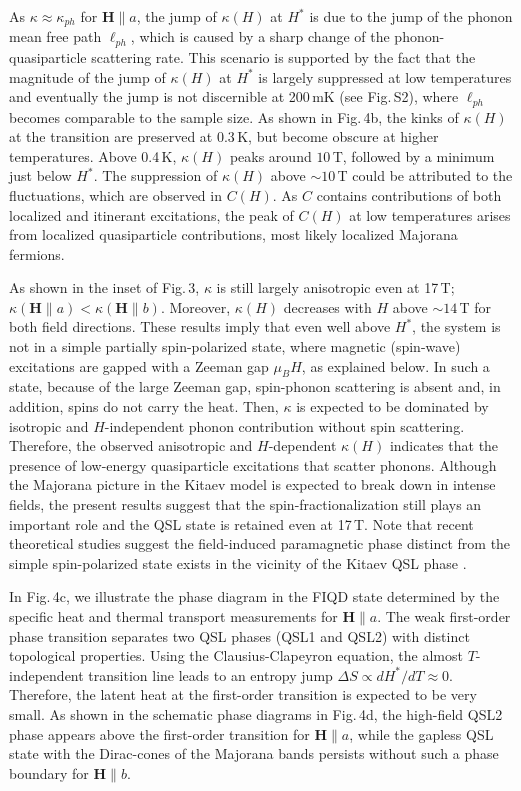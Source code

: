 \documentclass[twocolumn,preprintnumbers,prl,superscriptaddress,amsmath,amssymb,amsfonts]{revtex4}
\begin{document}
As $\kappa\approx\kappa_{ph}$ for ${\bm H}\parallel a$, the jump of $\kappa(H)$ at $H^*$ is due to the jump of the phonon mean free path $\ell_{ph}$, which is caused by a sharp change of the phonon-quasiparticle scattering rate. This scenario is supported by the fact that the magnitude of the jump of $\kappa(H)$ at $H^*$ is largely suppressed at low temperatures and eventually the jump is not discernible at 200\,mK (see Fig.\,S2), where $\ell_{ph}$ becomes comparable to the sample size. As shown in Fig.\,4b, the kinks of $\kappa(H)$ at the transition are preserved at 0.3\,K, but become obscure at higher temperatures. 
Above 0.4\,K, $\kappa(H)$ peaks around $10$\,T, followed by a minimum just below $H^*$. The suppression of $\kappa(H)$ above $\sim10$\,T could be attributed to the fluctuations, which are observed in $C(H)$. As $C$ contains contributions of both localized and itinerant excitations, the peak of $C(H)$ at low temperatures arises from localized quasiparticle contributions, most likely localized Majorana fermions.

As shown in the inset of Fig.\,3,  $\kappa$ is still largely anisotropic even at 17\,T; $\kappa({\bm H}\parallel a)<\kappa({\bm H}\parallel b)$. Moreover, $\kappa(H)$ decreases with $H$ above $\sim 14$\,T for both field directions. These results imply that even well above $H^*$, the system is not in a simple partially spin-polarized state, where magnetic (spin-wave) excitations are gapped with a Zeeman gap $\mu_BH$, as explained below. In such a state, because of the large Zeeman gap, spin-phonon scattering is absent and, in addition, spins do not carry the heat. Then, $\kappa$ is expected to be dominated by isotropic and $H$-independent phonon contribution without spin scattering.
Therefore, the observed anisotropic and $H$-dependent $\kappa(H)$ indicates that the presence of low-energy quasiparticle excitations that scatter phonons. Although the Majorana picture in the Kitaev model is expected to break down in intense fields, the present results suggest that the spin-fractionalization still plays an important role and the QSL state is retained even at 17\,T. Note that recent theoretical studies suggest the field-induced paramagnetic phase distinct from the simple spin-polarized state exists in the vicinity of the Kitaev QSL phase \cite{lee2020magnetic,PhysRevResearch.3.023189}.

In Fig.\,4c, we illustrate the phase diagram in the FIQD state determined by the specific heat and thermal transport measurements for ${\bm H}\parallel a$. The weak first-order phase transition separates two QSL phases (QSL1 and QSL2) with distinct topological properties. Using the Clausius-Clapeyron equation, the almost $T$-independent transition line leads to an entropy jump $\Delta S \propto dH^\ast / dT \approx 0$. Therefore, the latent heat at the first-order transition is expected to be very small. As shown in the schematic phase diagrams in Fig.\,4d, the high-field QSL2 phase appears above the first-order transition for ${\bm H}\parallel a$, while the gapless QSL state with the Dirac-cones of the Majorana bands persists without such a phase boundary for ${\bm H}\parallel b$.
\end{document}
